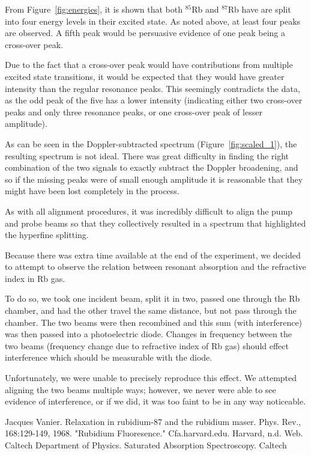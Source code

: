 \documentclass[paper=a4, fontsize=11pt]{scrartcl} %
\numberwithin{equation}{section}
\numberwithin{figure}{section}
\numberwithin{table}{section}
\begin{document}
From Figure~\ref{fig:energies}, it is shown that both $^{85}$Rb and $^{87}$Rb have are split into four energy levels in their excited state. As noted above, at least four peaks are observed. A fifth peak would be persuasive evidence of one peak being a cross-over peak.

Due to the fact that a cross-over peak would have contributions from multiple excited state transitions, it would be expected that they would have greater intensity than the regular resonance peaks. This seemingly contradicts the data, as the odd peak of the five has a lower intensity (indicating either two cross-over peaks and only three resonance peaks, or one cross-over peak of lesser amplitude).

As can be seen in the Doppler-subtracted spectrum
(Figure~\ref{fig:scaled_1}), the resulting spectrum is not ideal. There was great difficulty in finding the right combination of the two
signals to exactly subtract the Doppler broadening, and so if the
missing peaks were of small enough amplitude it is reasonable that
they might have been lost completely in the process.

As with all alignment procedures, it was incredibly difficult to align the pump and probe beams so that they collectively resulted in a spectrum that highlighted the hyperfine splitting.


\vspace{3em}

Because there was extra time available at the end of the experiment, we decided to attempt to observe the relation between resonant absorption and the refractive index in Rb gas.

To do so, we took one incident beam, split it in two, passed one through the Rb chamber, and had the other travel the same distance, but not pass through the chamber. The two beams were then recombined and this sum (with interference) was then passed into a photoelectric diode. Changes in frequency between the two beams (frequency change due to refractive index of Rb gas) should effect interference which should be measurable with the diode.

Unfortunately, we were unable to precisely reproduce this effect. We attempted aligning the two beams multiple ways; however, we never were able to see evidence of interference, or if we did, it was too faint to be in any way noticeable.


\begin{thebibliography}{99}
Jacques Vanier. Relaxation in rubidium-87 and the
  rubidium maser. Phys. Rev., 168:129-149, 1968.
"Rubidium Fluoresence." Cfa.harvard.edu. Harvard,
  n.d. Web.
Caltech Department of Physics. Saturated Absorption
Spectroscopy. Caltech
\end{thebibliography}


\end{document}
